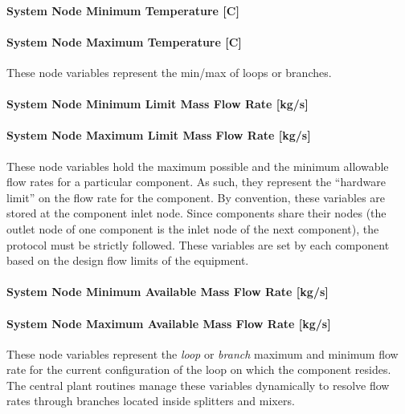 \paragraph{System Node Minimum Temperature {[}C{]}}\label{system-node-minimum-temperature-c}

\paragraph{System Node Maximum Temperature {[}C{]}}\label{system-node-maximum-temperature-c}

These node variables represent the min/max of loops or branches.

\paragraph{System Node Minimum Limit Mass Flow Rate {[}kg/s{]}}\label{system-node-minimum-limit-mass-flow-rate-kgs}

\paragraph{System Node Maximum Limit Mass Flow Rate {[}kg/s{]}}\label{system-node-maximum-limit-mass-flow-rate-kgs}

These node variables hold the maximum possible and the minimum allowable flow rates for a particular component. As such, they represent the ``hardware limit'' on the flow rate for the component. By convention, these variables are stored at the component inlet node. Since components share their nodes (the outlet node of one component is the inlet node of the next component), the protocol must be strictly followed. These variables are set by each component based on the design flow limits of the equipment.

\paragraph{System Node Minimum Available Mass Flow Rate {[}kg/s{]}}\label{system-node-minimum-available-mass-flow-rate-kgs}

\paragraph{System Node Maximum Available Mass Flow Rate {[}kg/s{]}}\label{system-node-maximum-available-mass-flow-rate-kgs}

These node variables represent the \emph{loop} or \emph{branch} maximum and minimum flow rate for the current configuration of the loop on which the component resides. The central plant routines manage these variables dynamically to resolve flow rates through branches located inside splitters and mixers.

